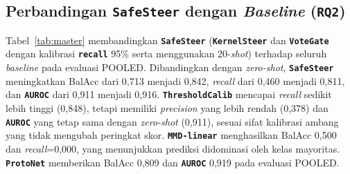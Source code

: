 \documentclass[conference]{IEEEtran}
\newcommand{\nama}[1]{\textbf{\texttt{#1}}}
\begin{document}
\subsection{Perbandingan \nama{SafeSteer} dengan \textit{Baseline} (\nama{RQ2})}
Tabel~\ref{tab:master} membandingkan \nama{SafeSteer} (\nama{KernelSteer} dan \nama{VoteGate} dengan kalibrasi \nama{recall} 95\% serta menggunakan 20-\textit{shot}) terhadap seluruh \textit{baseline} pada evaluasi POOLED.
Dibandingkan dengan \textit{zero-shot}, \nama{SafeSteer} meningkatkan BalAcc dari 0,713 menjadi 0,842, \textit{recall} dari 0,460 menjadi 0,811, dan \nama{AUROC} dari 0,911 menjadi 0,916. \nama{ThresholdCalib} mencapai \textit{recall} sedikit lebih tinggi (0,848), tetapi memiliki \textit{precision} yang lebih rendah (0,378) dan \nama{AUROC} yang tetap sama dengan \textit{zero-shot} (0,911), sesuai sifat kalibrasi ambang yang tidak mengubah peringkat skor. \nama{MMD-linear} menghasilkan BalAcc 0,500 dan \textit{recall}=0,000, yang menunjukkan prediksi didominasi oleh kelas mayoritas. \nama{ProtoNet} memberikan BalAcc 0,809 dan \nama{AUROC} 0,919 pada evaluasi POOLED.
\end{document}
